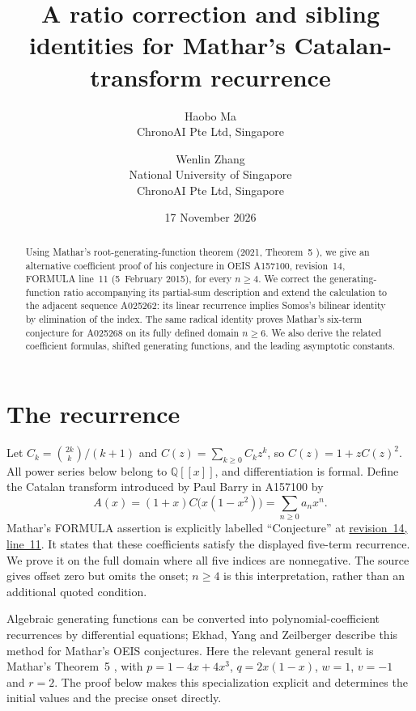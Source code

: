 \documentclass[11pt]{article}
\title{A ratio correction and sibling identities for Mathar's Catalan-transform recurrence}
\author{Haobo Ma\\
  \small ChronoAI Pte Ltd, Singapore
  \and Wenlin Zhang\\
  \small National University of Singapore\\
  \small ChronoAI Pte Ltd, Singapore}
\date{17 November 2026}
\newcommand{\Q}{\mathbb{Q}}
\begin{document}
\maketitle
\begin{abstract}
Using Mathar's root-generating-function theorem (2021, Theorem~5
\cite{mathar}), we give an alternative coefficient proof of his conjecture
in OEIS A157100, revision~14, FORMULA line~11 (5~February 2015), for
every $n\geq4$.
We correct the generating-function ratio accompanying its partial-sum
description and extend the calculation to the adjacent sequence A025262:
its linear recurrence implies Somos's bilinear identity by elimination of
the index. The same radical identity proves Mathar's six-term conjecture
for A025268 on its fully defined domain $n\geq6$.
We also derive the related coefficient formulas, shifted generating
functions, and the leading asymptotic constants.
\end{abstract}

\section{The recurrence}

Let $C_k=\binom{2k}{k}/(k+1)$ and
$C(z)=\sum_{k\geq0}C_kz^k$, so $C(z)=1+zC(z)^2$.
All power series below belong to $\Q[[x]]$, and differentiation is formal.
Define the Catalan transform introduced by Paul Barry in A157100
\cite{oeisa} by
\begin{equation}\label{eq:A}
 A(x)=(1+x)C\bigl(x(1-x^2)\bigr)=\sum_{n\geq0}a_nx^n.
\end{equation}
Mathar's FORMULA assertion is explicitly labelled ``Conjecture'' at
\href{https://raw.githubusercontent.com/oeis/oeisdata/57bbd254e161585873f56950ff19ba6dc4aeb66c/seq/A157/A157100.seq\#L11}
{revision~14, line~11}. It states that these coefficients satisfy the displayed
five-term recurrence. We prove it on the full domain where all five
indices are nonnegative. The source gives offset zero but omits the
onset; $n\geq4$ is this interpretation, rather than an additional quoted
condition.

Algebraic generating functions can be converted into polynomial-coefficient
recurrences by differential equations; Ekhad, Yang and Zeilberger
\cite{eyz} describe this method for Mathar's OEIS conjectures.
Here the relevant general result is Mathar's Theorem~5
\cite[\S4.2, equations (41)--(45)]{mathar}, with
$p=1-4x+4x^3$, $q=2x(1-x)$, $w=1$, $v=-1$ and $r=2$.
The proof below makes this specialization explicit and determines the
initial values and the precise onset directly.
\end{document}
